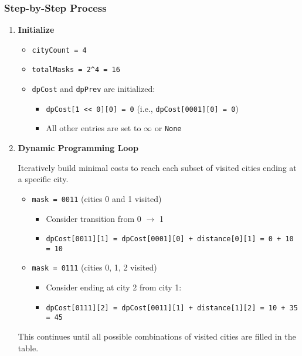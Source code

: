 \documentclass{article}
\begin{document}
\subsubsection*{Step-by-Step Process}
\begin{enumerate}
    \item \textbf{Initialize}
    
    \begin{itemize}
        \item \texttt{cityCount = 4}
        \item \texttt{totalMasks = 2\textasciicircum4 = 16}
        \item \texttt{dpCost} and \texttt{dpPrev} are initialized:
            \begin{itemize}
                \item \texttt{dpCost[1 << 0][0] = 0} \quad (i.e., \texttt{dpCost[0001][0] = 0})
                \item All other entries are set to $\infty$ or \texttt{None}
            \end{itemize}
    \end{itemize}

    \item \textbf{Dynamic Programming Loop}

    Iteratively build minimal costs to reach each subset of visited cities ending at a specific city.

    \begin{itemize}
        \item \texttt{mask = 0011} (cities 0 and 1 visited)
            \begin{itemize}
                \item Consider transition from 0 $\rightarrow$ 1
                \item \texttt{dpCost[0011][1] = dpCost[0001][0] + distance[0][1] = 0 + 10 = 10}
            \end{itemize}
        \item \texttt{mask = 0111} (cities 0, 1, 2 visited)
            \begin{itemize}
                \item Consider ending at city 2 from city 1:
                \item \texttt{dpCost[0111][2] = dpCost[0011][1] + distance[1][2] = 10 + 35 = 45}
            \end{itemize}
    \end{itemize}

    This continues until all possible combinations of visited cities are filled in the table.


\end{enumerate}
\end{document}
